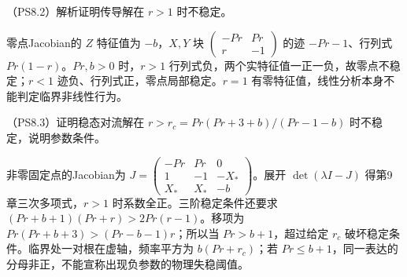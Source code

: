 \begin{exercise}
（PS8.2）解析证明传导解在 $r>1$ 时不稳定。
\end{exercise}
\begin{solution}
零点Jacobian的 $Z$ 特征值为 $-b$，$X,Y$ 块 $\left(\begin{smallmatrix}-Pr&Pr\\r&-1\end{smallmatrix}\right)$ 的迹 $-Pr-1$、行列式 $Pr(1-r)$。$Pr,b>0$ 时，$r>1$ 行列式负，两个实特征值一正一负，故零点不稳定；$r<1$ 迹负、行列式正，零点局部稳定。$r=1$ 有零特征值，线性分析本身不能判定临界非线性行为。
\end{solution}

\begin{exercise}
（PS8.3）证明稳态对流解在 $r>r_c=Pr(Pr+3+b)/(Pr-1-b)$ 时不稳定，说明参数条件。
\end{exercise}
\begin{solution}
非零固定点的Jacobian为 $J=\left(\begin{smallmatrix}-Pr&Pr&0\\1&-1&-X_*\\X_*&X_*&-b\end{smallmatrix}\right)$。展开 $\det(\lambda I-J)$ 得第9章三次多项式，$r>1$ 时系数全正。三阶稳定条件还要求 $(Pr+b+1)(Pr+r)>2Pr(r-1)$。移项为 $Pr(Pr+b+3)>(Pr-b-1)r$；所以当 $Pr>b+1$，超过给定 $r_c$ 破坏稳定条件。临界处一对根在虚轴，频率平方为 $b(Pr+r_c)$；若 $Pr\le b+1$，同一表达的分母非正，不能宣称出现负参数的物理失稳阈值。
\end{solution}

